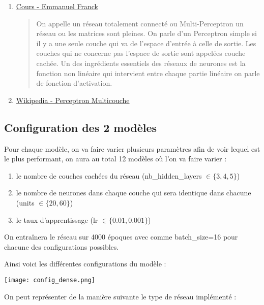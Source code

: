 \begin{enumerate}[label=\textbullet]
	\item\href{https://irma.math.unistra.fr/~franck/cours/SciML/output/html/chapAP_sec1.html}{Cours - Emmanuel Franck}
	
	\begin{quote}
		On appelle un réseau totalement connecté ou Multi-Perceptron un réseau ou les matrices sont pleines. On parle d'un Perceptron simple si il y a une seule couche qui va de l'espace d'entrée à celle de sortie. Les couches qui ne concerne pas l'espace de sortie sont appelées couche cachée. Un des ingrédients essentiels des réseaux de neurones est la fonction non linéaire qui intervient entre chaque partie linéaire on parle de fonction d'activation.
	\end{quote}

	\item\href{https://fr.wikipedia.org/wiki/Perceptron_multicouche}{Wikipedia - Perceptron Multicouche}
\end{enumerate}

\subsection{Configuration des 2 modèles}

Pour chaque modèle, on va faire varier plusieurs paramètres afin de voir lequel est le plus performant, on aura au total 12 modèles où l'on va faire varier :
\begin{enumerate}[label=\textbullet]
	\item le nombre de couches cachées du réseau (nb\_hidden\_layers $\in\{3,4,5\}$)
	\item le nombre de neurones dans chaque couche qui sera identique dans chacune (units $\in\{20,60\}$)
	\item le taux d'apprentissage (lr $\in\{0.01,0.001\}$)
\end{enumerate}
On entraînera le réseau sur 4000 époques avec comme batch\_size=16 pour chacune des configurations possibles.

Ainsi voici les différentes configurations du modèle :

\begin{minipage}{\linewidth}
	\centering
	\texttt{[image: config\_dense.png]}
\end{minipage}

On peut représenter de la manière suivante le type de réseau implémenté :

